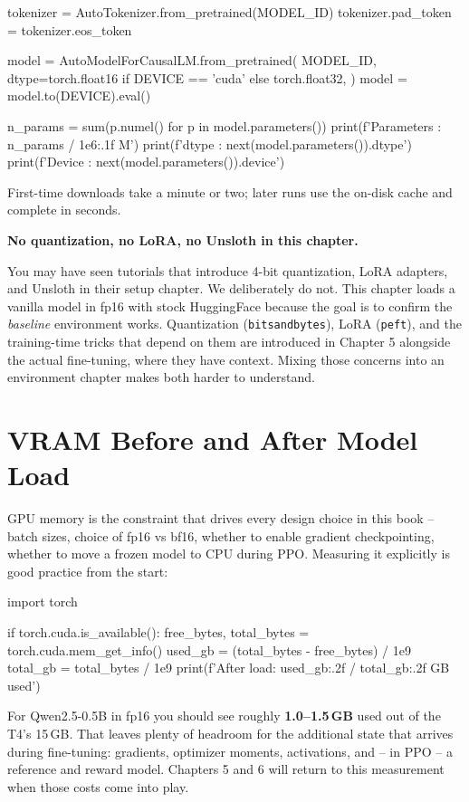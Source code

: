 \begin{chapterenv}
\begin{codeblock}[python]
tokenizer = AutoTokenizer.from_pretrained(MODEL_ID)
tokenizer.pad_token = tokenizer.eos_token

model = AutoModelForCausalLM.from_pretrained(
    MODEL_ID,
    dtype=torch.float16 if DEVICE == 'cuda' else torch.float32,
)
model = model.to(DEVICE).eval()

n_params = sum(p.numel() for p in model.parameters())
print(f'Parameters : {n_params / 1e6:.1f} M')
print(f'dtype      : {next(model.parameters()).dtype}')
print(f'Device     : {next(model.parameters()).device}')
\end{codeblock}

First-time downloads take a minute or two; later runs use the on-disk cache and complete in seconds.

\begin{infobox}
\textbf{No quantization, no LoRA, no Unsloth in this chapter.}

You may have seen tutorials that introduce 4-bit quantization, LoRA adapters, and Unsloth in their setup chapter. We deliberately do not. This chapter loads a vanilla model in fp16 with stock HuggingFace because the goal is to confirm the \emph{baseline} environment works. Quantization (\texttt{bitsandbytes}), LoRA (\texttt{peft}), and the training-time tricks that depend on them are introduced in Chapter 5 alongside the actual fine-tuning, where they have context. Mixing those concerns into an environment chapter makes both harder to understand.
\end{infobox}

\section{VRAM Before and After Model Load}

GPU memory is the constraint that drives every design choice in this book -- batch sizes, choice of fp16 vs bf16, whether to enable gradient checkpointing, whether to move a frozen model to CPU during PPO. Measuring it explicitly is good practice from the start:

\begin{codeblock}[python]
import torch

if torch.cuda.is_available():
    free_bytes, total_bytes = torch.cuda.mem_get_info()
    used_gb  = (total_bytes - free_bytes) / 1e9
    total_gb = total_bytes / 1e9
    print(f'After load: {used_gb:.2f} / {total_gb:.2f} GB used')
\end{codeblock}

For Qwen2.5-0.5B in fp16 you should see roughly \textbf{1.0--1.5\,GB} used out of the T4's 15\,GB. That leaves plenty of headroom for the additional state that arrives during fine-tuning: gradients, optimizer moments, activations, and -- in PPO -- a reference and reward model. Chapters 5 and 6 will return to this measurement when those costs come into play.


\end{chapterenv}
